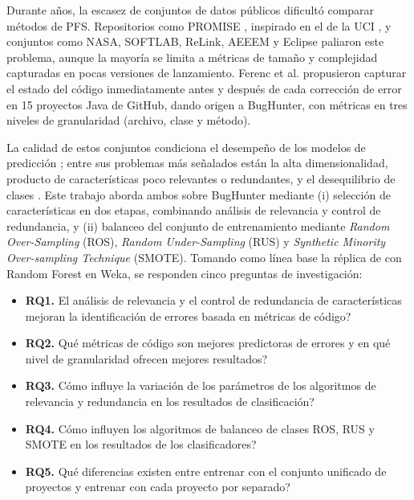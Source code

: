 \documentclass[conference,a4paper]{IEEEtran}
\begin{document}
Durante años, la escasez de conjuntos de datos públicos dificultó comparar métodos de PFS. Repositorios como PROMISE \cite{promise2005}, inspirado en el de la UCI \cite{uci1987}, y conjuntos como NASA, SOFTLAB, ReLink, AEEEM y Eclipse paliaron este problema, aunque la mayoría se limita a métricas de tamaño y complejidad capturadas en pocas versiones de lanzamiento. Ferenc et al. \cite{ferenc2020} propusieron capturar el estado del código inmediatamente antes y después de cada corrección de error en 15 proyectos Java de GitHub, dando origen a BugHunter, con métricas en tres niveles de granularidad (archivo, clase y método).

La calidad de estos conjuntos condiciona el desempeño de los modelos de predicción \cite{rathi2023}; entre sus problemas más señalados están la alta dimensionalidad, producto de características poco relevantes o redundantes, y el desequilibrio de clases \cite{tantithamthavorn2020}. Este trabajo aborda ambos sobre BugHunter mediante (i) selección de características en dos etapas, combinando análisis de relevancia y control de redundancia, y (ii) balanceo del conjunto de entrenamiento mediante \textit{Random Over-Sampling} (ROS), \textit{Random Under-Sampling} (RUS) y \textit{Synthetic Minority Over-sampling Technique} (SMOTE). Tomando como línea base la réplica de \cite{ferenc2020} con Random Forest en Weka, se responden cinco preguntas de investigación:

\begin{itemize}
\item \textbf{RQ1.} \textquestiondown{}El análisis de relevancia y el control de redundancia de características mejoran la identificación de errores basada en métricas de código?
\item \textbf{RQ2.} \textquestiondown{}Qué métricas de código son mejores predictoras de errores y en qué nivel de granularidad ofrecen mejores resultados?
\item \textbf{RQ3.} \textquestiondown{}Cómo influye la variación de los parámetros de los algoritmos de relevancia y redundancia en los resultados de clasificación?
\item \textbf{RQ4.} \textquestiondown{}Cómo influyen los algoritmos de balanceo de clases ROS, RUS y SMOTE en los resultados de los clasificadores?
\item \textbf{RQ5.} \textquestiondown{}Qué diferencias existen entre entrenar con el conjunto unificado de proyectos y entrenar con cada proyecto por separado?
\end{itemize}
\end{document}
